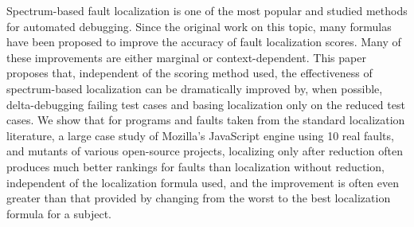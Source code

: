 Spectrum-based fault localization is one of the most popular and studied methods for automated debugging. Since the original work on this topic, many formulas have been proposed to improve the accuracy of fault localization scores. Many of these improvements are either marginal or context-dependent.  This paper proposes that, independent of the scoring method used, the effectiveness of spectrum-based localization can be dramatically improved by, when possible, delta-debugging failing test cases and basing localization only on the reduced test cases. We show that for programs and faults taken from the standard localization literature, a large case study of Mozilla’s JavaScript engine using 10 real faults, and mutants of various open-source projects, localizing only after reduction often produces much better rankings for faults than localization without reduction, independent of the localization formula used, and the improvement is often even greater than that provided by changing from the worst to the best localization formula for a subject.